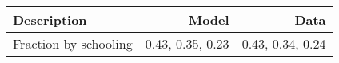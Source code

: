 \begin{tabular}{lrr}
\hline
Description & Model  & Data  \\ 
\hline
Fraction by schooling & 0.43, 0.35, 0.23  & 0.43, 0.34, 0.24  \\ 
\hline
\end{tabular}%
